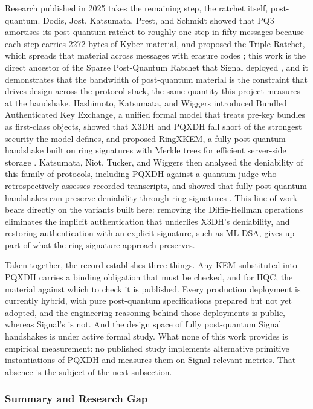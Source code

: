 Research published in 2025 takes the remaining step, the ratchet itself, post-quantum. Dodis, Jost, Katsumata, Prest, and Schmidt showed that PQ3 amortises its post-quantum ratchet to roughly one step in fifty messages because each step carries 2272 bytes of Kyber material, and proposed the Triple Ratchet, which spreads that material across messages with erasure codes \cite{dodis_triple_2025}; this work is the direct ancestor of the Sparse Post-Quantum Ratchet that Signal deployed \cite{connell_signal_nodate}, and it demonstrates that the bandwidth of post-quantum material is the constraint that drives design across the protocol stack, the same quantity this project measures at the handshake. Hashimoto, Katsumata, and Wiggers introduced Bundled Authenticated Key Exchange, a unified formal model that treats pre-key bundles as first-class objects, showed that X3DH and PQXDH fall short of the strongest security the model defines, and proposed RingXKEM, a fully post-quantum handshake built on ring signatures with Merkle trees for efficient server-side storage \cite{hashimoto_bundled_2025}. Katsumata, Niot, Tucker, and Wiggers then analysed the deniability of this family of protocols, including PQXDH against a quantum judge who retrospectively assesses recorded transcripts, and showed that fully post-quantum handshakes can preserve deniability through ring signatures \cite{katsumata_comprehensive_2025}. This line of work bears directly on the variants built here: removing the Diffie-Hellman operations eliminates the implicit authentication that underlies X3DH's deniability, and restoring authentication with an explicit signature, such as ML-DSA, gives up part of what the ring-signature approach preserves.

Taken together, the record establishes three things. Any KEM substituted into PQXDH carries a binding obligation that must be checked, and for HQC, the material against which to check it is published. Every production deployment is currently hybrid, with pure post-quantum specifications prepared but not yet adopted, and the engineering reasoning behind those deployments is public, whereas Signal's is not. And the design space of fully post-quantum Signal handshakes is under active formal study. What none of this work provides is empirical measurement: no published study implements alternative primitive instantiations of PQXDH and measures them on Signal-relevant metrics. That absence is the subject of the next subsection.

\subsubsection{Summary and Research Gap}
\label{subsubsec:lit-gap}

